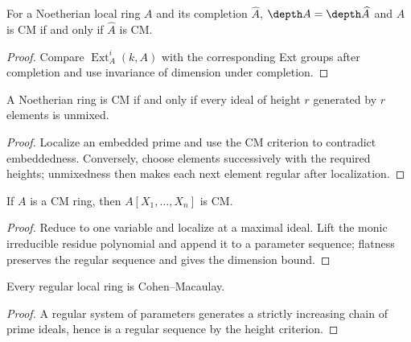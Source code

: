 \begin{theorem}\label{mcrt-thm-17-5}
For a Noetherian local ring $A$ and its completion $\widehat A$,
$\depth A=\depth\widehat A$ and $A$ is CM if and only if $\widehat A$ is CM.
\end{theorem}
\begin{proof}
Compare $\operatorname{Ext}^i_A(k,A)$ with the corresponding Ext groups after
completion and use invariance of dimension under completion.
\end{proof}

\begin{theorem}\label{mcrt-thm-17-6}
A Noetherian ring is CM if and only if every ideal of height $r$ generated by
$r$ elements is unmixed.
\end{theorem}
\begin{proof}
Localize an embedded prime and use the CM criterion to contradict embeddedness.
Conversely, choose elements successively with the required heights; unmixedness
then makes each next element regular after localization.
\end{proof}

\begin{theorem}\label{mcrt-thm-17-7}
If $A$ is a CM ring, then $A[X_1,\ldots,X_n]$ is CM.
\end{theorem}
\begin{proof}
Reduce to one variable and localize at a maximal ideal.  Lift the monic
irreducible residue polynomial and append it to a parameter sequence; flatness
preserves the regular sequence and gives the dimension bound.
\end{proof}

\begin{theorem}\label{mcrt-thm-17-8}
Every regular local ring is Cohen--Macaulay.
\end{theorem}
\begin{proof}
A regular system of parameters generates a strictly increasing chain of prime
ideals, hence is a regular sequence by the height criterion.
\end{proof}

